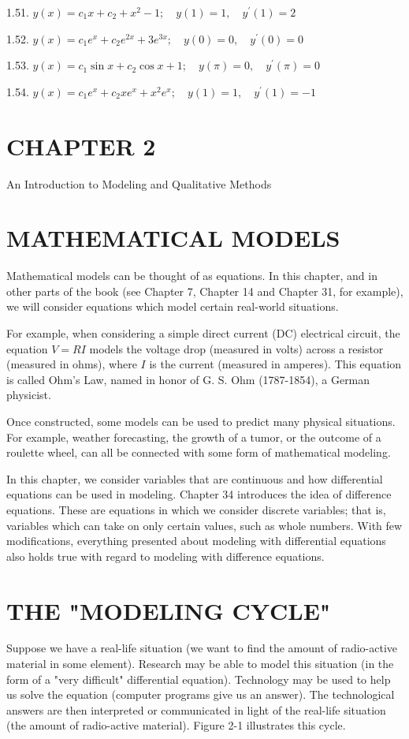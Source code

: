 \documentclass[10pt]{article}
\begin{document}
1.51. $y(x)=c_{1} x+c_{2}+x^{2}-1 ; \quad y(1)=1, \quad y^{\prime}(1)=2$

1.52. $y(x)=c_{1} e^{x}+c_{2} e^{2 x}+3 e^{3 x} ; \quad y(0)=0, \quad y^{\prime}(0)=0$

1.53. $y(x)=c_{1} \sin x+c_{2} \cos x+1 ; \quad y(\pi)=0, \quad y^{\prime}(\pi)=0$

1.54. $y(x)=c_{1} e^{x}+c_{2} x e^{x}+x^{2} e^{x} ; \quad y(1)=1, \quad y^{\prime}(1)=-1$

\section*{CHAPTER 2}
An Introduction to Modeling and Qualitative Methods

\section*{MATHEMATICAL MODELS}
Mathematical models can be thought of as equations. In this chapter, and in other parts of the book (see Chapter 7, Chapter 14 and Chapter 31, for example), we will consider equations which model certain real-world situations.

For example, when considering a simple direct current (DC) electrical circuit, the equation $V=R I$ models the voltage drop (measured in volts) across a resistor (measured in ohms), where $I$ is the current (measured in amperes). This equation is called Ohm's Law, named in honor of G. S. Ohm (1787-1854), a German physicist.

Once constructed, some models can be used to predict many physical situations. For example, weather forecasting, the growth of a tumor, or the outcome of a roulette wheel, can all be connected with some form of mathematical modeling.

In this chapter, we consider variables that are continuous and how differential equations can be used in modeling. Chapter 34 introduces the idea of difference equations. These are equations in which we consider discrete variables; that is, variables which can take on only certain values, such as whole numbers. With few modifications, everything presented about modeling with differential equations also holds true with regard to modeling with difference equations.

\section*{THE "MODELING CYCLE"}
Suppose we have a real-life situation (we want to find the amount of radio-active material in some element). Research may be able to model this situation (in the form of a "very difficult" differential equation). Technology may be used to help us solve the equation (computer programs give us an answer). The technological answers are then interpreted or communicated in light of the real-life situation (the amount of radio-active material). Figure 2-1 illustrates this cycle.
\end{document}
